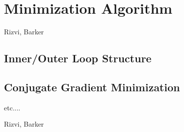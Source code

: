 \chapter{Minimization Algorithm}
\label{minim}

Rizvi, Barker

\section{Inner/Outer Loop Structure}
\label{inoutloop}

\section{Conjugate Gradient Minimization}
\label{conjgrad}

etc....

Rizvi, Barker
